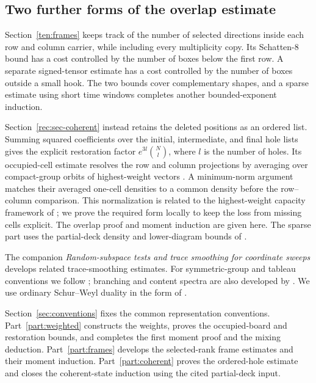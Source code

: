 \subsection{Two further forms of the overlap estimate}
Section~\ref{ten:frames} keeps track of the number of selected directions
inside each row and column carrier, while including every multiplicity
copy. Its Schatten-$8$ bound has a cost controlled by the number of boxes
below the first row. A separate signed-tensor estimate has a cost
controlled by the number of boxes outside a small hook. The two bounds
cover complementary shapes, and a sparse estimate using short time
windows completes another bounded-exponent induction.

Section~\ref{rec:sec-coherent} instead retains the deleted positions as
an ordered list. Summing squared coefficients over the initial,
intermediate, and final hole lists gives the explicit restoration
factor $e^{3l}\binom Nl$, where $l$ is the number of holes. Its
occupied-cell estimate resolves the row and column projections by averaging
over compact-group orbits of highest-weight vectors
\cite[Section~2]{Perelomov1972}. A minimum-norm argument matches their
averaged one-cell densities to a common density before the row--column
comparison. This normalization is related to the highest-weight capacity
framework of \citet[Sections~2 and~4]{FranksWalter2022}; we prove the
required form locally to keep the loss from missing cells explicit. The
overlap proof and moment induction are given here.
The sparse part uses the partial-deck density and lower-diagram bounds
of \citet[Theorem~6.1 and Proposition~6.3]{OpenAI2026Routing}.

The companion \emph{Random-subspace tests and trace smoothing for
coordinate sweeps} \cite{OpenAI2026RandomSubspace} develops related
trace-smoothing estimates. For symmetric-group and tableau conventions we
follow \citet{Sagan2001,Stanley1999}; branching and content spectra are
also developed by \citet{VershikOkounkov2005}. We use ordinary
Schur--Weyl duality in the form of \citet[Theorem~4.57 and
Corollary~4.59]{etingof}.

Section~\ref{sec:conventions} fixes the common representation conventions.
Part~\ref{part:weighted} constructs the weights, proves the occupied-board
and restoration bounds, and completes the first moment proof and the
mixing deduction. Part~\ref{part:frames} develops the selected-rank frame
estimates and their moment induction. Part~\ref{part:coherent} proves
the ordered-hole estimate and closes the coherent-state induction using
the cited partial-deck input.
